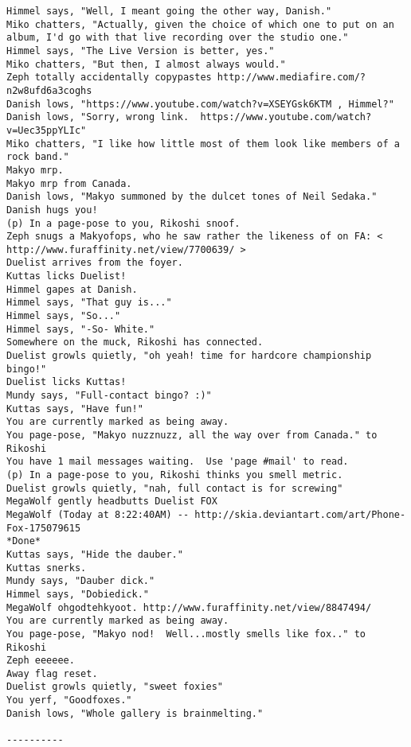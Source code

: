 \begin{verbatim}
Himmel says, "Well, I meant going the other way, Danish."
Miko chatters, "Actually, given the choice of which one to put on an album, I'd go with that live recording over the studio one."
Himmel says, "The Live Version is better, yes."
Miko chatters, "But then, I almost always would."
Zeph totally accidentally copypastes http://www.mediafire.com/?n2w8ufd6a3coghs
Danish lows, "https://www.youtube.com/watch?v=XSEYGsk6KTM , Himmel?"
Danish lows, "Sorry, wrong link.  https://www.youtube.com/watch?v=Uec35ppYLIc"
Miko chatters, "I like how little most of them look like members of a rock band."
Makyo mrp.
Makyo mrp from Canada.
Danish lows, "Makyo summoned by the dulcet tones of Neil Sedaka."
Danish hugs you!
(p) In a page-pose to you, Rikoshi snoof.
Zeph snugs a Makyofops, who he saw rather the likeness of on FA: < http://www.furaffinity.net/view/7700639/ >
Duelist arrives from the foyer.
Kuttas licks Duelist!
Himmel gapes at Danish.
Himmel says, "That guy is..."
Himmel says, "So..."
Himmel says, "-So- White."
Somewhere on the muck, Rikoshi has connected.
Duelist growls quietly, "oh yeah! time for hardcore championship bingo!"
Duelist licks Kuttas!
Mundy says, "Full-contact bingo? :)"
Kuttas says, "Have fun!"
You are currently marked as being away.
You page-pose, "Makyo nuzznuzz, all the way over from Canada." to Rikoshi
You have 1 mail messages waiting.  Use 'page #mail' to read.
(p) In a page-pose to you, Rikoshi thinks you smell metric.
Duelist growls quietly, "nah, full contact is for screwing"
MegaWolf gently headbutts Duelist FOX
MegaWolf (Today at 8:22:40AM) -- http://skia.deviantart.com/art/Phone-Fox-175079615
*Done*
Kuttas says, "Hide the dauber."
Kuttas snerks.
Mundy says, "Dauber dick."
Himmel says, "Dobiedick."
MegaWolf ohgodtehkyoot. http://www.furaffinity.net/view/8847494/
You are currently marked as being away.
You page-pose, "Makyo nod!  Well...mostly smells like fox.." to Rikoshi
Zeph eeeeee.
Away flag reset.
Duelist growls quietly, "sweet foxies"
You yerf, "Goodfoxes."
Danish lows, "Whole gallery is brainmelting."

----------


\end{verbatim}
